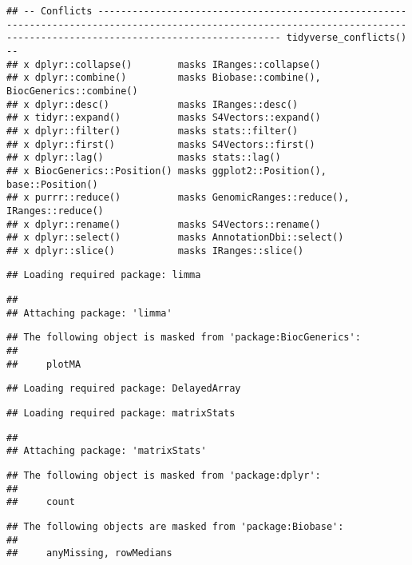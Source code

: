 \documentclass[]{article}
\begin{document}
\begin{verbatim}
## -- Conflicts ---------------------------------------------------------------------------------------------------------------------------------------------------------------------------- tidyverse_conflicts() --
## x dplyr::collapse()        masks IRanges::collapse()
## x dplyr::combine()         masks Biobase::combine(), BiocGenerics::combine()
## x dplyr::desc()            masks IRanges::desc()
## x tidyr::expand()          masks S4Vectors::expand()
## x dplyr::filter()          masks stats::filter()
## x dplyr::first()           masks S4Vectors::first()
## x dplyr::lag()             masks stats::lag()
## x BiocGenerics::Position() masks ggplot2::Position(), base::Position()
## x purrr::reduce()          masks GenomicRanges::reduce(), IRanges::reduce()
## x dplyr::rename()          masks S4Vectors::rename()
## x dplyr::select()          masks AnnotationDbi::select()
## x dplyr::slice()           masks IRanges::slice()
\end{verbatim}

\begin{verbatim}
## Loading required package: limma
\end{verbatim}

\begin{verbatim}
## 
## Attaching package: 'limma'
\end{verbatim}

\begin{verbatim}
## The following object is masked from 'package:BiocGenerics':
## 
##     plotMA
\end{verbatim}

\begin{verbatim}
## Loading required package: DelayedArray
\end{verbatim}

\begin{verbatim}
## Loading required package: matrixStats
\end{verbatim}

\begin{verbatim}
## 
## Attaching package: 'matrixStats'
\end{verbatim}

\begin{verbatim}
## The following object is masked from 'package:dplyr':
## 
##     count
\end{verbatim}

\begin{verbatim}
## The following objects are masked from 'package:Biobase':
## 
##     anyMissing, rowMedians
\end{verbatim}
\end{document}
